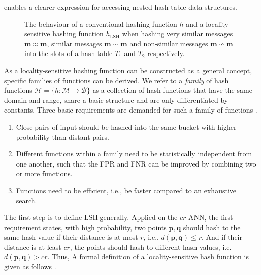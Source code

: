 \documentclass[../../../main.tex]{subfiles}
\begin{document}
enables a clearer expression for accessing nested hash table data structures.

\begin{figure}[t!]
    \centering
    
    \caption{The behaviour of a conventional hashing function $h$ and a locality-sensitive hashing function $h_{\text{LSH}}$ when hashing very similar messages $\bm{m} \approx \bm{m}$, similar messages $\bm{m} \sim \bm{m}$ and non-similar messages $\bm{m} \not\sim \bm{m}$ into the slots of a hash table $T_1$ and $T_2$ respectively.}
    \label{fig:hashing_differences}
\end{figure}

As a locality-sensitive hashing function can be constructed as a general concept, specific families of functions can be derived. We refer to a \textit{family} of hash functions $\mathcal{H} = \{ h: \mathcal{M} \rightarrow \mathcal{B} \}$ as a collection of hash functions that have the same domain and range, share a basic structure and are only differentiated by constants. Three basic requirements are demanded for such a family of functions \cite[99]{leskovec_rajaraman_ullman_2014}.

\begin{enumerate}
    \item Close pairs of input should be hashed into the same bucket with higher probability than distant pairs.
    \item Different functions within a family need to be statistically independent from one another, such that the FPR and FNR can be improved by combining two or more functions.
    \item Functions need to be efficient, i.e., be faster compared to an exhaustive search.

\end{enumerate}

The first step is to define LSH generally. Applied on the $cr$-ANN, the first requirement states, with high probability, two points $\bm{p}, \bm{q}$ should hash to the same hash value if their distance is at most $r$, i.e., $d(\bm{p},\bm{q}) \leq r$. And if their distance is at least $cr$, the points should hash to different hash values, i.e. $d(\bm{p},\bm{q}) > cr$. Thus,  A formal definition of a locality-sensitive hash function is given as follows \cite{andoni2006near}.
\end{document}
